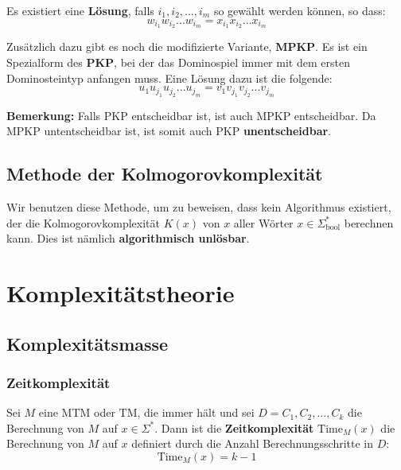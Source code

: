 \documentclass[11pt]{article}
\newcommand{\ttc}{\text{Time}}
\begin{document}
Es existiert eine \textbf{Lösung}, falls $i_1, i_2,..., i_m$ so gew{\"a}hlt werden können, so dass:
\begin{equation*}
	w_{i_1}w_{i_2}...w_{i_m} = x_{i_1}x_{i_2}...x_{i_m}
\end{equation*}

Zus{\"a}tzlich dazu gibt es noch die modifizierte Variante, \textbf{MPKP}. Es ist ein Spezialform des \textbf{PKP}, bei der das Dominospiel immer mit dem ersten Dominosteintyp anfangen muss. Eine Lösung dazu ist die folgende:
\begin{equation*}
	u_1u_{j_1}u_{j_2}...u_{j_m} = v_1v_{j_1}v_{j_2}...v_{j_m}
\end{equation*}

\textbf{Bemerkung:} Falls PKP entscheidbar ist, ist auch MPKP entscheidbar. Da MPKP untentscheidbar ist, ist somit auch PKP \textbf{unentscheidbar}.

\subsection{Methode der Kolmogorovkomplexit{\"a}t}

Wir benutzen diese Methode, um zu beweisen, dass kein Algorithmus existiert, der die Kolmogorovkomplexit{\"a}t $K(x)$ von $x$ aller Wörter $x \in \Sigma^*_\text{bool}$ berechnen kann. Dies ist n{\"a}mlich \textbf{algorithmisch unlösbar}.

\section{Komplexit{\"a}tstheorie}

\subsection{Komplexit{\"a}tsmasse}

\subsubsection{Zeitkomplexit{\"a}t}

Sei $M$ eine MTM oder TM, die immer h{\"a}lt und sei $D = C_1,C_2,...,C_k$ die Berechnung von $M$ auf $x \in \Sigma^*$. Dann ist die \textbf{Zeitkomplexit{\"a}t} $\ttc_M(x)$ die Berechnung von $M$ auf $x$ definiert durch die Anzahl Berechnungsschritte in $D$:
\begin{equation*}
	\ttc_M(x) = k-1
\end{equation*}
\end{document}
